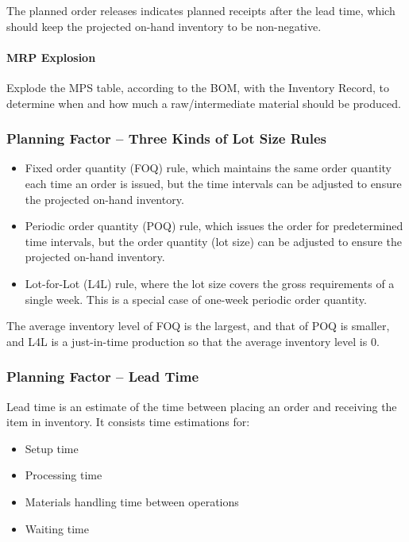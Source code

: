 \documentclass{article}
\begin{document}
The planned order releases indicates planned receipts after the lead time,
which should keep the projected on-hand inventory to be non-negative.

\paragraph{MRP Explosion}

Explode the MPS table, according to the BOM, with the Inventory Record,
to determine when and how much a raw/intermediate material should be produced.


\subsubsection{Planning Factor -- Three Kinds of Lot Size Rules}

\begin{itemize}
	\item Fixed order quantity (FOQ) rule, which maintains the same order quantity each time an order is issued,
					but the time intervals can be adjusted to ensure the projected on-hand inventory.
	\item Periodic order quantity (POQ) rule, which issues the order for predetermined time intervals,
					but the order quantity (lot size) can be adjusted to ensure the projected on-hand inventory.
  \item Lot-for-Lot (L4L) rule, where the lot size covers the gross requirements of a single week.
					This is a special case of one-week periodic order quantity.
\end{itemize}

The average inventory level of FOQ is the largest, and that of POQ is smaller,
and L4L is a just-in-time production so that the average inventory level is 0.

\subsubsection{Planning Factor -- Lead Time}

Lead time is an estimate of the time between placing an order and receiving the item in inventory.
It consists time estimations for:

\begin{itemize}
	\item Setup time
	\item Processing time
	\item Materials handling time between operations
	\item Waiting time
\end{itemize}
\end{document}
